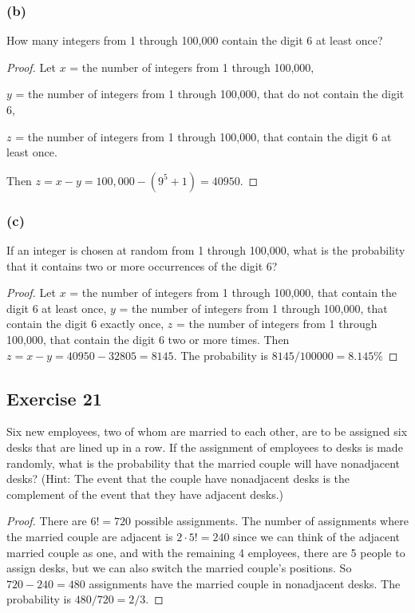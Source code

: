 \documentclass[14pt]{extarticle}
\begin{document}
\subsubsection{(b)}
How many integers from 1 through 100,000 contain the digit 6 at least once?

\begin{proof}
Let $x$ = the number of integers from 1 through 100,000,

$y$ = the number of integers from 1 through 100,000, that do not contain the digit 6,

$z$ = the number of integers from 1 through 100,000, that contain the digit 6 at least once.

Then \(z = x - y = 100,000 - (9^5 + 1) = 40950\).
\end{proof}

\subsubsection{(c)}
If an integer is chosen at random from 1 through 100,000, what is the probability that it contains two or more occurrences of the digit 6?

\begin{proof}
Let $x$ = the number of integers from 1 through 100,000, that contain the digit 6 at least once, $y$ = the number of 
integers from 1 through 100,000, that contain the digit 6 exactly once, $z$ = the number of integers from 1 through 
100,000, that contain the digit 6 two or more times. Then \(z = x - y = 40950 - 32805 = 8145\). The probability is 
\(8145 / 100000 = 8.145\%\)
\end{proof}

\subsection{Exercise 21}
Six new employees, two of whom are married to each other, are to be assigned six desks that are lined up in a row. If 
the assignment of employees to desks is made randomly, what is the probability that the married couple will have 
nonadjacent desks? (Hint: The event that the couple have nonadjacent desks is the complement of the event that they 
have adjacent desks.)

\begin{proof}
There are \(6! = 720\) possible assignments. The number of assignments where the married couple are adjacent is 
\(2 \cdot 5! = 240\) since we can think of the adjacent married couple as one, and with the remaining 4 employees, 
there are 5 people to assign desks, but we can also switch the married couple's positions. So \(720-240 = 480\) 
assignments have the married couple in nonadjacent desks. The probability is \(480/720 = 2/3\).
\end{proof}
\end{document}
